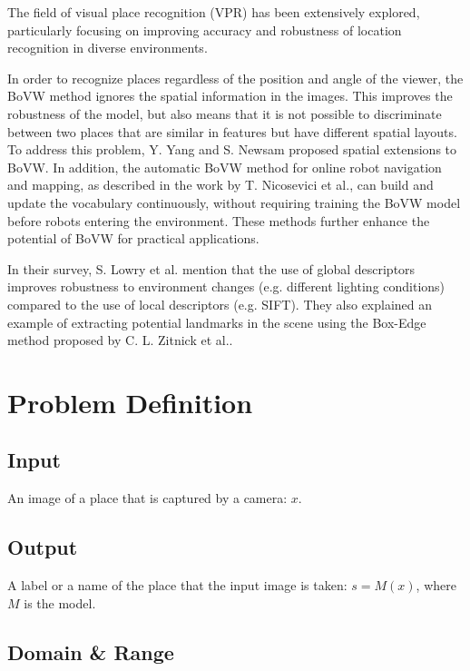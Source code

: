 \documentclass[conference]{IEEEtran}
\begin{document}
The field of visual place recognition (VPR) has been extensively explored, particularly focusing on improving accuracy and robustness of location recognition in diverse environments.

In order to recognize places regardless of the position and angle of the viewer, the BoVW method ignores the spatial information in the images\cite{lowry2015visual}. This improves the robustness of the model, but also means that it is not possible to discriminate between two places that are similar in features but have different spatial layouts. To address this problem, Y. Yang and S. Newsam\cite{yang2010bag} proposed spatial extensions to BoVW. In addition, the automatic BoVW method for online robot navigation and mapping, as described in the work by T. Nicosevici et al.\cite{nicosevici2012automatic}, can build and update the vocabulary continuously, without requiring training the BoVW model before robots entering the environment. These methods further enhance the potential of BoVW for practical applications.

In their survey, S. Lowry et al.\cite{lowry2015visual} mention that the use of global descriptors improves robustness to environment changes (e.g. different lighting conditions) compared to the use of local descriptors (e.g. SIFT). They also explained an example of extracting potential landmarks in the scene using the Box-Edge method proposed by C. L. Zitnick et al.\cite{zitnick2014edge}.

\section{Problem Definition}

\subsection{Input}

An image of a place that is captured by a camera: $x$.

\subsection{Output}

A label or a name of the place that the input image is taken: $s = M(x)$, where $M$ is the model.

\subsection{Domain \& Range}
\end{document}
